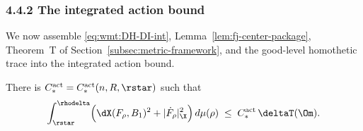 \subsubsection{4.4.2 The integrated action bound}
\label{subsec:wmt:integrated-action}

We now assemble \eqref{eq:wmt:DH-DI-int},
Lemma~\ref{lem:fj-center-package}, Theorem~T of
Section~\ref{subsec:metric-framework}, and the good-level homothetic
trace into the integrated action bound.

\begin{theorem}\label{thm:wmt:52int}
There is $C_*^{\mathrm{act}}=C_*^{\mathrm{act}}(n,R,\rstar)$
such that
\begin{equation}\label{eq:wmt:52int}
   \int_{\rstar}^{\rhodelta}
     \Bigl(\dX(F_\rho,B_1)^2+|\dot F_\rho|_{\X}^2\Bigr)\,d\mu(\rho)
   \;\le\; C_*^{\mathrm{act}}\,\deltaT(\Om).
\end{equation}
\end{theorem}


